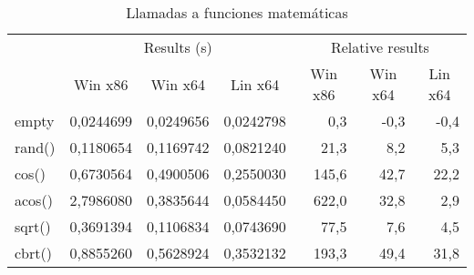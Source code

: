 \begin{table}[h]
\centering
\begin{tabular}{@{}l|rrr|rrr|@{}}
\cmidrule(l){2-7}
                             & \multicolumn{3}{c|}{Results (s)}                                                               & \multicolumn{3}{c|}{Relative results}                                                      \\ \cmidrule(l){2-7} 
                             & \multicolumn{1}{c|}{Win x86} & \multicolumn{1}{c|}{Win x64} & \multicolumn{1}{c|}{Lin x64} & \multicolumn{1}{c|}{Win x86} & \multicolumn{1}{c|}{Win x64} & \multicolumn{1}{c|}{Lin x64} \\ \midrule
\multicolumn{1}{|l|}{empty}  & 0,0244699                    & 0,0249656                    & 0,0242798                    & 0,3                          & -0,3                         & -0,4                         \\ \cmidrule(r){1-1}
\multicolumn{1}{|l|}{rand()} & 0,1180654                    & 0,1169742                    & 0,0821240                    & 21,3                         & 8,2                          & 5,3                          \\ \cmidrule(r){1-1}
\multicolumn{1}{|l|}{cos()}  & 0,6730564                    & 0,4900506                    & 0,2550030                    & 145,6                        & 42,7                         & 22,2                         \\ \cmidrule(r){1-1}
\multicolumn{1}{|l|}{acos()} & 2,7986080                    & 0,3835644                    & 0,0584450                    & 622,0                        & 32,8                         & 2,9                          \\ \cmidrule(r){1-1}
\multicolumn{1}{|l|}{sqrt()} & 0,3691394                    & 0,1106834                    & 0,0743690                    & 77,5                         & 7,6                          & 4,5                          \\ \cmidrule(r){1-1}
\multicolumn{1}{|l|}{cbrt()} & 0,8855260                    & 0,5628924                    & 0,3532132                    & 193,3                        & 49,4                         & 31,8                         \\ \bottomrule
\end{tabular}
\caption{Llamadas a funciones matemáticas}
\end{table}

